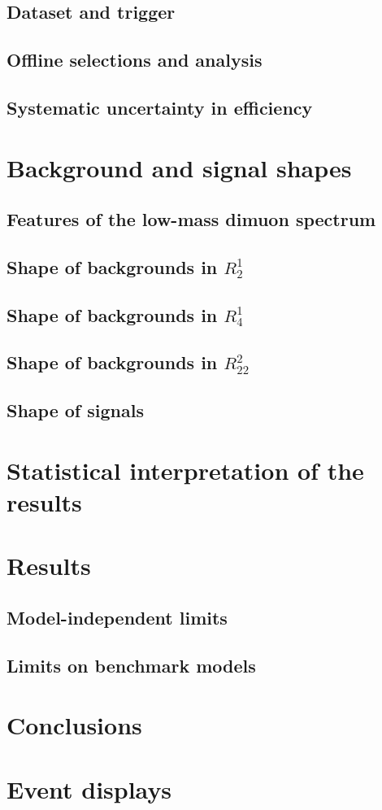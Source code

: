 \documentclass[prd,twocolumn]{revtex4}
\begin{document}
\subsection{Dataset and trigger}

\subsection{Offline selections and analysis}

\subsection{Systematic uncertainty in efficiency}

\section{Background and signal shapes}

\subsection{Features of the low-mass dimuon spectrum}

\subsection{Shape of backgrounds in $R^1_2$}

\subsection{Shape of backgrounds in $R^1_4$}

\subsection{Shape of backgrounds in $R^2_{22}$}

\subsection{Shape of signals}

\section{Statistical interpretation of the results}

\section{Results}

\subsection{Model-independent limits}

\subsection{Limits on benchmark models}

\section{Conclusions}

\appendix

\section{Event displays}



\end{document}
